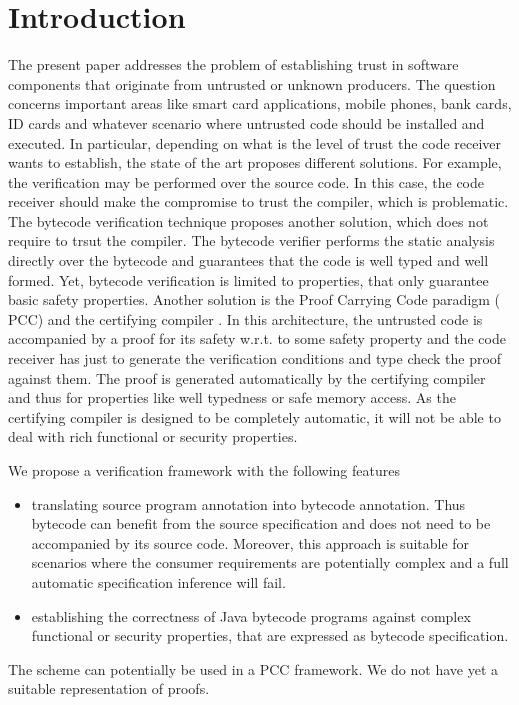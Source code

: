 
\section{Introduction}\label{intro}
The present paper addresses the  problem of establishing trust in software components that originate from untrusted or unknown producers. 
The question concerns important areas like 
smart card applications, mobile phones, bank cards, ID cards and whatever scenario where untrusted code should be installed and executed.
In particular, depending on what is the level of trust the code receiver wants to establish, 
the state of the art proposes different solutions. 
For example, the verification may be performed over the source code. 
In this case, the code receiver should make the compromise to trust the compiler, which is problematic. 
The bytecode verification technique proposes another solution, which does not require to trsut the compiler. 
The bytecode verifier performs the static analysis directly over the bytecode and guarantees that 
the code is well typed and well formed. Yet, bytecode verification is limited to properties, that only 
guarantee basic safety properties. %
Another solution is the Proof Carrying Code paradigm ( PCC)  and the certifying compiler \cite{Necula97,ComNec,DesNecLee98}.
 In this architecture, the untrusted code
is accompanied by a proof for its safety w.r.t. to some safety property and the code receiver has just to generate the 
verification conditions and type check the proof against them. 
The proof is generated automatically by the certifying compiler and thus for properties like well typedness or safe memory access. 
As the certifying compiler is designed to be completely automatic, it will not be able to deal with rich functional or security properties. 
 
We propose a verification framework with the following features
\begin{itemize}
  \item translating source program annotation into bytecode annotation.
 Thus bytecode can benefit from the source specification and  does not need to be accompanied by its source code. Moreover, 
this approach is suitable for scenarios where the consumer requirements are potentially complex and a full automatic specification inference
will fail. 
   \item establishing the correctness of Java bytecode programs against complex functional or security properties, that are expressed as bytecode
specification.
\end{itemize}
The scheme can potentially be used in a PCC framework. We do not have yet a suitable representation of proofs. 

